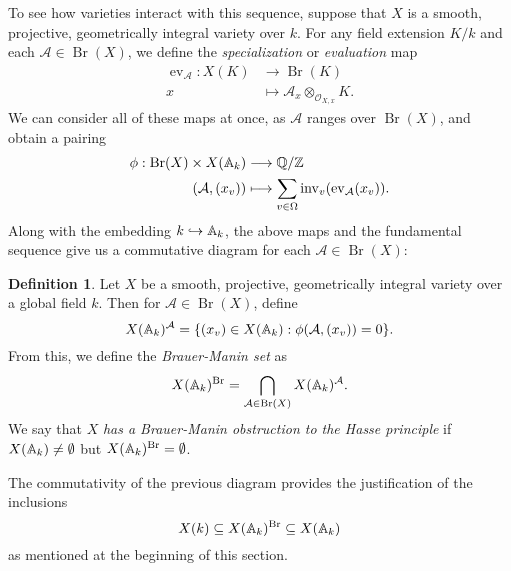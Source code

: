 \documentclass[12pt,twoside]{reedthesis}
\theoremstyle{plain}
\theoremstyle{definition}
\newtheorem{definition}{Definition}[section]
\theoremstyle{remark}
\newcommand{\ZZ}{\mathbb{Z}}
\newcommand{\Affine}{\mathbb{A}}
\newcommand{\QQ}{\mathbb{Q}}
\newcommand{\calA}{\mathcal{A}}
\newcommand{\calO}{\mathcal{O}}
\newcommand{\Br}{\operatorname{Br}}
\newcommand{\adele}{\reflectbox{$\Affine$}}
\newcommand{\ev}{\operatorname{ev}}
\newcommand{\inv}{\operatorname{inv}}
\begin{document}
To see how varieties interact with this sequence, suppose that $X$ is a smooth, projective, geometrically integral variety over $k$. For any field extension $K/k$ and each $\calA\in\Br(X)$, we define the \emph{specialization} or \emph{evaluation} map
\begin{align*}
\ev_\calA:X(K)&\longrightarrow\Br(K)\\
x&\longmapsto\calA_x\otimes_{\calO_{X,x}}K.
\end{align*}
We can consider all of these maps at once, as $\calA$ ranges over $\Br(X)$, and obtain a pairing
\begin{align*}
\phi:\Br(X)\times X(\adele_k)&\longrightarrow\QQ/\ZZ\\
(\calA,(x_v))&\longmapsto\sum_{v\in\Omega}\inv_v(\ev_\calA(x_v)).
\end{align*}
Along with the embedding $k\hookrightarrow\adele_k$, the above maps and the fundamental sequence give us a commutative diagram for each $\calA\in\Br(X)$:
\begin{figure}[h]
\centering
{}
\end{figure}
\begin{definition}
Let $X$ be a smooth, projective, geometrically integral variety over a global field $k$. Then for $\calA\in\Br(X)$, define 
\[
X(\adele_k)^\calA=\{(x_v)\in X(\adele_k):\phi(\calA,(x_v))=0\}.
\]
From this, we define the \emph{Brauer-Manin set} as
\[
X(\adele_k)^{\Br}=\bigcap_{\calA\in\Br(X)}X(\adele_k)^\calA.
\]
We say that $X$ \emph{has a Brauer-Manin obstruction to the Hasse principle} if $X(\adele_k)\neq\emptyset$ but $X(\adele_k)^{\Br}=\emptyset$.
\end{definition}
\noindent The commutativity of the previous diagram provides the justification of the inclusions
\[
X(k)\subseteq X(\adele_k)^{\Br}\subseteq X(\adele_k)
\]
as mentioned at the beginning of this section.
\end{document}

